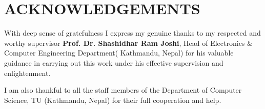 \pagebreak
\chapter*{ACKNOWLEDGEMENTS}

With deep sense of gratefulness I express my genuine thanks to my respected and worthy supervisor \textbf{Prof. Dr. Shashidhar Ram Joshi}, Head of Electronics \& Computer Engineering Department( Kathmandu, Nepal) for his valuable guidance in carrying out this work under his effective supervision and enlightenment.

I am also thankful to all the staff members of the Department of Computer Science, TU (Kathmandu, Nepal) for their full cooperation and help.
